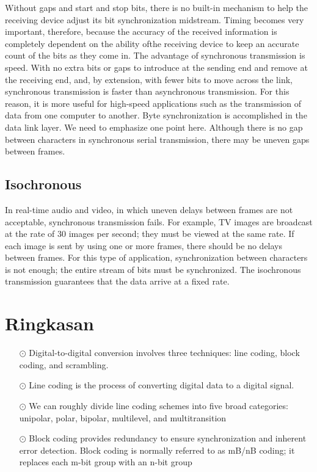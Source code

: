 Without gaps and start and stop bits, there is no built-in mechanism to help the receiving device adjust its bit synchronization midstream. Timing becomes very important, therefore, because the accuracy of the received information is completely dependent on the ability ofthe receiving device to keep an accurate count of the bits as they come in. The advantage of synchronous transmission is speed. With no extra bits or gaps to introduce at the sending end and remove at the receiving end, and, by extension, with fewer bits to move across the link, synchronous transmission is faster than asynchronous transmission. For this reason, it is more useful for high-speed applications such as the transmission of data from one computer to another. Byte synchronization is accomplished in the data link layer. We need to emphasize one point here. Although there is no gap between characters in synchronous serial transmission, there may be uneven gaps between frames.


\subsection*{Isochronous}
In real-time audio and video, in which uneven delays between frames are not acceptable, synchronous transmission fails. For example, TV images are broadcast at the rate of 30 images per second; they must be viewed at the same rate. If each image is sent by using one or more frames, there should be no delays between frames. For this type of application, synchronization between characters is not enough; the entire stream of bits must be synchronized. The isochronous transmission guarantees that the data arrive at a fixed rate.

\section{Ringkasan}
\begin{itemize}
  \item[$\odot$] Digital-to-digital conversion involves three techniques: line coding, block coding, and scrambling.
  \item[$\odot$] Line coding is the process of converting digital data to a digital signal.
  \item[$\odot$] We can roughly divide line coding schemes into five broad categories: unipolar, polar, bipolar, multilevel, and multitransition
  \item[$\odot$] Block coding provides redundancy to ensure synchronization and inherent error detection. Block coding is normally referred to as mB/nB coding; it replaces each m-bit group with an n-bit group
\end{itemize}

